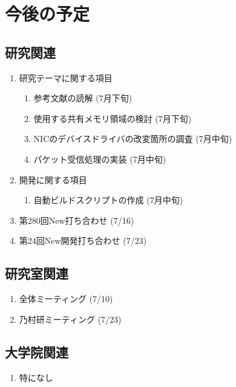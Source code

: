 \documentclass[fleqn, 14pt]{extarticle}
\begin{document}
\section{今後の予定}
\label{sec-4}
\subsection{研究関連}
\label{sec-4-1}

\begin{enumerate}

\item 研究テーマに関する項目
\hfill
\begin{enumerate}


\item 参考文献の読解
\hfill
(7月下旬)

\item 使用する共有メモリ領域の検討
\hfill
(7月下旬)

\item NICのデバイスドライバの改変箇所の調査
\hfill
(7月中旬)

\item パケット受信処理の実装
\hfill
(7月中旬)
\end{enumerate}
\item 開発に関する項目
\hfill
\begin{enumerate}

\item 自動ビルドスクリプトの作成
\hfill
(7月中旬)

\end{enumerate}

\item 第280回New打ち合わせ
\hfill
\label{enum-7}
(7/16)

\item 第24回New開発打ち合わせ
\hfill
\label{enum-7}
(7/23)

\end{enumerate}
\subsection{研究室関連}
\label{sec-4-2}

\begin{enumerate}

\item 全体ミーティング
\hfill
\label{enum-18}
(7/10)

\item 乃村研ミーティング 
\hfill
\label{enum-18}
(7/23)

\end{enumerate}

\subsection{大学院関連}
\begin{enumerate}

\item 特になし
\hfill
\label{enum-17}


\end{enumerate}
\end{document}
